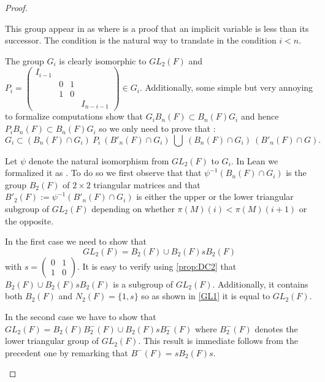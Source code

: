 \begin{proof}
\begin{enumerate}
    This group appear in \Lean as  where  is a proof that an implicit variable  is less than its successor. The condition  is the natural way to translate in \Lean the condition $i<n$.

    The group $G_i$ is clearly isomorphic to $GL_2\left( F \right)$ and $P_i = 
    \left(\begin{smallmatrix}
        I_{i-1} \\ & 0 & 1 \\ & 1 & 0 \\ & & & I_{n-i-1}
    \end{smallmatrix} \right ) \in G_i$.
Additionally, some simple but very annoying to formalize computations show that $G_i B_n(F) \subset B_n(F) G_i$ and hence $P_i B_n(F) \subset B_n(F) G_i$ so we only need to prove that : 
    $$G_i \subset \left(B_n(F) \cap G_i\right) \ P_i \ \left( B'_n(F) \cap  G_i\right) \ \bigcup \ \left(B_n(F) \cap G_i\right) \ \left(B'_n(F) \cap G\right).$$

    Let $\psi$ denote the natural isomorphism from $GL_2(F)$ to $G_i$. In Lean we formalized it as . To do so we first observe that that $\psi^{-1} \left(B_n(F) \cap G_i \right)$ is the group $B_2\left( F \right)$ of $2 \times 2$ triangular matrices and that $B'_2(F) := \psi^{-1}\left( B'_n(F) \cap G_i \right)$ is either the upper or the lower triangular subgroup of $GL_2\left( F \right)$ depending on whether $\pi\left( M \right) (i) < \pi\left( M \right) (i+1)$ or the opposite.

    

In the first case we need to show that $$GL_2(F) = B_2(F) \cup B_2(F) s B_2 (F)$$ with $s = \left( \begin{smallmatrix}
    0 & 1 \\
    1 & 0
\end{smallmatrix} \right)$.
It is easy to verify using \ref{prop:DC2} that $B_2(F) \cup B_2(F) s B_2 (F)$ is a subgroup of $GL_2(F)$. Additionally, it contains both $B_2(F)$ and $N_2(F)=\{1,s\}$ so as shown in \ref{GL1} it is equal to $GL_2(F)$.

In the second case we have to show that $GL_2 (F) = B_2(F) B_2^{-}(F) \cup B_2(F) s B_2^{-} (F)$ where $B_2^{-}\left( F \right)$ denotes the lower triangular group of $GL_2(F)$. This result is immediate follows from the precedent one by remarking that $B^{-}(F) = s B_2(F) s$.


\end{enumerate}
\end{proof}
